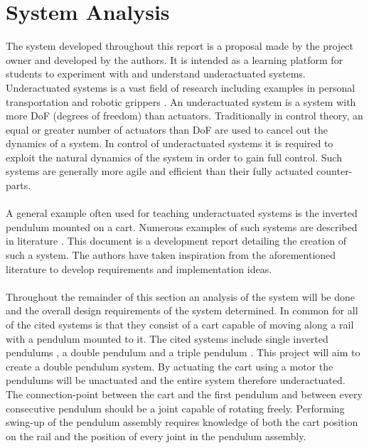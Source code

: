\section{System Analysis}
The system developed throughout this report is a proposal made by the project owner and developed by the authors.
It is intended as a learning platform for students to experiment with and understand underactuated systems.
Underactuated systems is a vast field of research including examples in personal transportation \cite{scooter} \cite{segway} and robotic grippers \cite{threegripper} \cite{softgripper}.
An underactuated system is a system with more DoF (degrees of freedom) than actuators.
Traditionally in control theory, an equal or greater number of actuators than DoF are used to cancel out the dynamics of a system.
In control of underactuated systems it is required to exploit the natural dynamics of the system \cite{mitunderactuated} in order to gain full control.
Such systems are generally more agile and efficient than their fully actuated counter-parts.
\\~\\
A general example often used for teaching underactuated systems is the inverted pendulum mounted on a cart.
Numerous examples of such systems are described in literature \cite{invertpendulum1} \cite{tripleinvertpendulum} \cite{invertpendulum3} \cite{doubleinvertpendulum}.
This document is a development report detailing the creation of such a system.
The authors have taken inspiration from the aforementioned literature to develop requirements and implementation ideas.
\\~\\
Throughout the remainder of this section an analysis of the system will be done and the overall design requirements of the system determined.
In common for all of the cited systems is that they consist of a cart capable of moving along a rail with a pendulum mounted to it.
The cited systems include single inverted pendulums \cite{invertpendulum1} \cite{invertpendulum3}, a double pendulum \cite{doubleinvertpendulum} and a triple pendulum \cite{tripleinvertpendulum}.
This project will aim to create a double pendulum system.
By actuating the cart using a motor the pendulums will be unactuated and the entire system therefore underactuated.
The connection-point between the cart and the first pendulum and between every consecutive pendulum should be a joint capable of rotating freely.
Performing swing-up of the pendulum assembly requires knowledge of both the cart position on the rail and the position of every joint in the pendulum assembly.  
